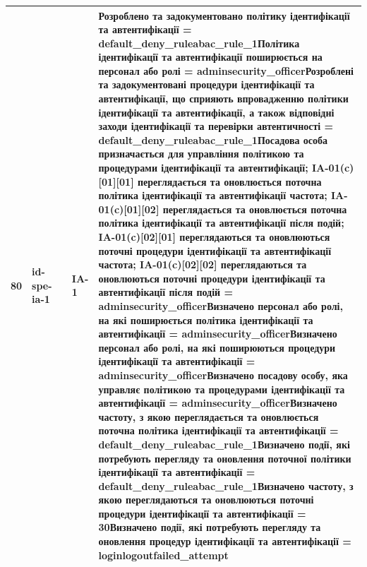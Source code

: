 \documentclass[10pt]{article}
\begin{document}
\begin{longtable}{|c|>{\raggedright\arraybackslash}p{2.5cm}|>{\raggedright\arraybackslash}p{4.5cm}|>{\raggedright\arraybackslash}p{3cm}|>{\raggedright\arraybackslash}p{4.5cm}|}
80 & id-spe-ia-1 &  & IA-1 & Розроблено та задокументовано політику ідентифікації та автентифікації = \textbf{default\_\allowbreak{}deny\_\allowbreak{}ruleabac\_\allowbreak{}rule\_\allowbreak{}1}\newline Політика ідентифікації та автентифікації поширюється на персонал або ролі = \textbf{adminsecurity\_\allowbreak{}officer}\newline Розроблені та задокументовані процедури ідентифікації та автентифікації, що сприяють впровадженню політики ідентифікації та автентифікації, а також відповідні заходи ідентифікації та перевірки автентичності = \textbf{default\_\allowbreak{}deny\_\allowbreak{}ruleabac\_\allowbreak{}rule\_\allowbreak{}1}\newline Посадова особа призначається для управління політикою та процедурами ідентифікації та автентифікації; IA-01(c)[01][01] переглядається та оновлюється поточна політика ідентифікації та автентифікації частота; IA-01(c)[01][02] переглядається та оновлюється поточна політика ідентифікації та автентифікації після подій; IA-01(c)[02][01] переглядаються та оновлюються поточні процедури ідентифікації та автентифікації частота; IA-01(c)[02][02] переглядаються та оновлюються поточні процедури ідентифікації та автентифікації після подій = \textbf{adminsecurity\_\allowbreak{}officer}\newline Визначено персонал або ролі, на які поширюється політика ідентифікації та автентифікації = \textbf{adminsecurity\_\allowbreak{}officer}\newline Визначено персонал або ролі, на які поширюються процедури ідентифікації та автентифікації = \textbf{adminsecurity\_\allowbreak{}officer}\newline Визначено посадову особу, яка управляє політикою та процедурами ідентифікації та автентифікації = \textbf{adminsecurity\_\allowbreak{}officer}\newline Визначено частоту, з якою переглядається та оновлюється поточна політика ідентифікації та автентифікації = \textbf{default\_\allowbreak{}deny\_\allowbreak{}ruleabac\_\allowbreak{}rule\_\allowbreak{}1}\newline Визначено події, які потребують перегляду та оновлення поточної політики ідентифікації та автентифікації = \textbf{default\_\allowbreak{}deny\_\allowbreak{}ruleabac\_\allowbreak{}rule\_\allowbreak{}1}\newline Визначено частоту, з якою переглядаються та оновлюються поточні процедури ідентифікації та автентифікації = \textbf{30}\newline Визначено події, які потребують перегляду та оновлення процедур ідентифікації та автентифікації = \textbf{loginlogoutfailed\_\allowbreak{}attempt} \\ \hline

\end{longtable}
\end{document}
